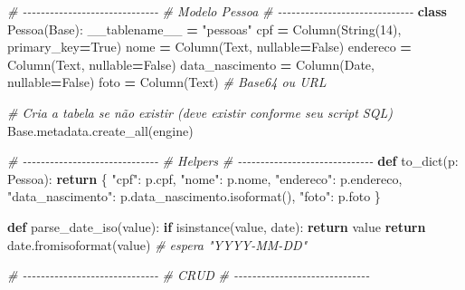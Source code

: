 \documentclass[
]{book}
\newenvironment{Shaded}{\begin{snugshade}}{\end{snugshade}}
\newcommand{\BuiltInTok}[1]{#1}
\newcommand{\CommentTok}[1]{\textcolor[rgb]{0.56,0.35,0.01}{\textit{#1}}}
\newcommand{\ControlFlowTok}[1]{\textcolor[rgb]{0.13,0.29,0.53}{\textbf{#1}}}
\newcommand{\DecValTok}[1]{\textcolor[rgb]{0.00,0.00,0.81}{#1}}
\newcommand{\KeywordTok}[1]{\textcolor[rgb]{0.13,0.29,0.53}{\textbf{#1}}}
\newcommand{\NormalTok}[1]{#1}
\newcommand{\OperatorTok}[1]{\textcolor[rgb]{0.81,0.36,0.00}{\textbf{#1}}}
\newcommand{\StringTok}[1]{\textcolor[rgb]{0.31,0.60,0.02}{#1}}
\newcommand{\VariableTok}[1]{\textcolor[rgb]{0.00,0.00,0.00}{#1}}
\begin{document}
\begin{Shaded}
\begin{Highlighting}[]
\CommentTok{\# {-}{-}{-}{-}{-}{-}{-}{-}{-}{-}{-}{-}{-}{-}{-}{-}{-}{-}{-}{-}{-}{-}{-}{-}{-}{-}{-}{-}{-}{-}}
\CommentTok{\# Modelo Pessoa}
\CommentTok{\# {-}{-}{-}{-}{-}{-}{-}{-}{-}{-}{-}{-}{-}{-}{-}{-}{-}{-}{-}{-}{-}{-}{-}{-}{-}{-}{-}{-}{-}{-}}
\KeywordTok{class}\NormalTok{ Pessoa(Base):}
\NormalTok{    \_\_tablename\_\_ }\OperatorTok{=} \StringTok{"pessoas"}
\NormalTok{    cpf }\OperatorTok{=}\NormalTok{ Column(String(}\DecValTok{14}\NormalTok{), primary\_key}\OperatorTok{=}\VariableTok{True}\NormalTok{)}
\NormalTok{    nome }\OperatorTok{=}\NormalTok{ Column(Text, nullable}\OperatorTok{=}\VariableTok{False}\NormalTok{)}
\NormalTok{    endereco }\OperatorTok{=}\NormalTok{ Column(Text, nullable}\OperatorTok{=}\VariableTok{False}\NormalTok{)}
\NormalTok{    data\_nascimento }\OperatorTok{=}\NormalTok{ Column(Date, nullable}\OperatorTok{=}\VariableTok{False}\NormalTok{)}
\NormalTok{    foto }\OperatorTok{=}\NormalTok{ Column(Text)  }\CommentTok{\# Base64 ou URL}

\CommentTok{\# Cria a tabela se não existir (deve existir conforme seu script SQL)}
\NormalTok{Base.metadata.create\_all(engine)}

\CommentTok{\# {-}{-}{-}{-}{-}{-}{-}{-}{-}{-}{-}{-}{-}{-}{-}{-}{-}{-}{-}{-}{-}{-}{-}{-}{-}{-}{-}{-}{-}{-}}
\CommentTok{\# Helpers}
\CommentTok{\# {-}{-}{-}{-}{-}{-}{-}{-}{-}{-}{-}{-}{-}{-}{-}{-}{-}{-}{-}{-}{-}{-}{-}{-}{-}{-}{-}{-}{-}{-}}
\KeywordTok{def}\NormalTok{ to\_dict(p: Pessoa):}
    \ControlFlowTok{return}\NormalTok{ \{}
        \StringTok{"cpf"}\NormalTok{: p.cpf,}
        \StringTok{"nome"}\NormalTok{: p.nome,}
        \StringTok{"endereco"}\NormalTok{: p.endereco,}
        \StringTok{"data\_nascimento"}\NormalTok{: p.data\_nascimento.isoformat(),}
        \StringTok{"foto"}\NormalTok{: p.foto}
\NormalTok{    \}}

\KeywordTok{def}\NormalTok{ parse\_date\_iso(value):}
    \ControlFlowTok{if} \BuiltInTok{isinstance}\NormalTok{(value, date):}
        \ControlFlowTok{return}\NormalTok{ value}
    \ControlFlowTok{return}\NormalTok{ date.fromisoformat(value)  }\CommentTok{\# espera "YYYY{-}MM{-}DD"}

\CommentTok{\# {-}{-}{-}{-}{-}{-}{-}{-}{-}{-}{-}{-}{-}{-}{-}{-}{-}{-}{-}{-}{-}{-}{-}{-}{-}{-}{-}{-}{-}{-}}
\CommentTok{\# CRUD}
\CommentTok{\# {-}{-}{-}{-}{-}{-}{-}{-}{-}{-}{-}{-}{-}{-}{-}{-}{-}{-}{-}{-}{-}{-}{-}{-}{-}{-}{-}{-}{-}{-}}


\end{Highlighting}
\end{Shaded}
\end{document}
